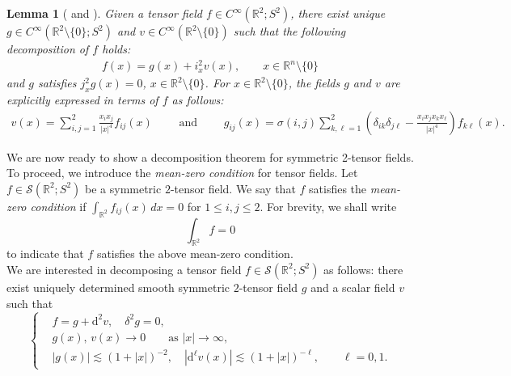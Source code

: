 \documentclass[11pt]{article}
\newcommand{\abs}[1]{\lvert #1 \rvert}
\newcommand{\D}{\mathrm{d}}
\newcommand{\Rb}{\mathbb{R}}
\newcommand*\Rn{\mathbb{R}^n}
\newcommand{\sch}{\mathcal{S}}
\newtheorem{lemma}[theorem]{Lemma}
\newcommand{\qum}[1]{\quad\mbox{#1}}
\begin{document}
\begin{lemma}[{\cite[Lemma 3.2]{Rohit_Suman} and \cite[Lemma 2.6.1]{Sharafutdinov_book}}]
\label{th: decomposition of f in frequency variable} 
Given a tensor field $f\in C^{\infty}(\Rb^2;S^2)$, there exist unique $g\in C^{\infty}(\Rb^2\setminus\{0\};S^2)$ and  $v\in C^{\infty}(\Rb^2\setminus\{0\})$ such that the following decomposition of $f$ holds:
	\begin{align}\label{eq: decomposition of f in frequency variable}
	f(x) = g(x) + i^2_{x} v (x),  \qquad x \in \Rn\setminus\{0\}
	\end{align}
and $g$ satisfies $j^2_{x} g(x) =0$, $x \in \Rb^2\setminus\{0\}$. For $x \in \Rb^2\setminus\{0\}$, the fields $g$ and $v$ are explicitly expressed in terms of $f$ as follows:
\begin{align}\label{eq: expression of v and g}
v(x) 
= \sum_{i,j=1}^2\frac{x_{i} x_{j}}{|x|^{4}}f_{i j}(x) \qquad \mbox{ and } \qquad 	g_{ij}(x) 
= \sigma(i,j)\sum_{k,\ell=1}^2\left( \delta_{ik}\delta_{j\ell} - \frac{x_{i} x_{j}x_{k} x_{\ell}}{|x|^{4}}\right)f_{k \ell}(x).
\end{align}	
\end{lemma}
\noindent We are now ready to show a decomposition theorem for symmetric 2-tensor fields. To proceed, we introduce the \emph{mean-zero condition} for tensor fields. Let
$f \in \mathcal{S}(\mathbb{R}^2;S^2)$ be a symmetric $2$-tensor field. We say that $f$ satisfies the
\emph{mean-zero condition} if
$
\int_{\mathbb{R}^2} f_{ij}(x)\,dx = 0$ for  $1 \leq i,j \leq 2.$
For brevity, we shall write
\[
\int_{\mathbb{R}^2} f = 0
\]
to indicate that \(f\) satisfies the above mean-zero condition.
\vspace{2mm} \\
We are interested in decomposing a tensor field $f\in \sch(\mathbb{R}^2;S^2)$ as follows:
there exist uniquely determined smooth symmetric $2$-tensor field $g$ and  a scalar field $v$ such that
\begin{equation}\label{new_decomp_of_f_no_restriction}
\left\{
\begin{aligned}
&f = g+\D^2v, \quad
\delta^2 g =0, \\
&g(x),\,v(x) \to 0 \qquad \text{as } |x|\to\infty, \\
&|g(x)| \lesssim (1+|x|)^{-2},\quad
|\D^\ell v(x)| \lesssim (1+|x|)^{-\ell},
\qquad \ell=0,1.
\end{aligned}
\right.
\end{equation}
\end{document}
